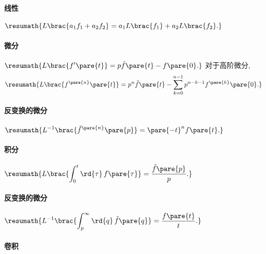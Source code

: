 \documentclass[hidelinks]{ctexart}
\begin{document}

\paragraph{线性} %
\label{par:线性}

$\displaystyle \resumath{L\brac{a_1 f_1 + a_2 f_2} = a_1 L\brac{f_1} + a_2 L\brac{f_2}.}$


\paragraph{微分} %
\label{par:微分}

$\displaystyle \resumath{L\brac{f'\pare{t}} = p\tilde{f}\pare{t} - f\pare{0}.}$ 对于高阶微分,
\[ \resumath{L\brac{f^{\pare{n}}\pare{t}} = p^n \tilde{f}\pare{t} - \sum_{k=0}^{n-1} p^{n-k-1} f^{\pare{k}}\pare{0}.} \]


\paragraph{反变换的微分} %
\label{par:反变换的微分}

$\displaystyle \resumath{L^{-1}\brac{\tilde{f}^{\pare{n}}\pare{p}} = \pare{-t}^n f\pare{t}.}$


\paragraph{积分} %
\label{par:积分}

$\displaystyle \resumath{L\brac{\int_0^t \rd{\tau}\, f\pare{\tau}} = \frac{\tilde{f}\pare{p}}{p}.}$


\paragraph{反变换的微分} %
\label{par:反变换的微分}

$\displaystyle \resumath{L^{-1}\brac{\int_p^\infty \rd{q}\, \tilde{f}\pare{q}} = \frac{f\pare{t}}{t}.}$


\paragraph{卷积} %
\label{par:卷积}
\end{document}
